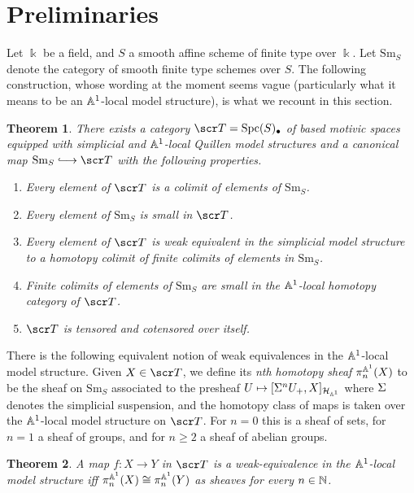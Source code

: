 \documentclass{amsart}
\newtheorem{thm}{Theorem}[section]
\theoremstyle{definition}
\begin{document}
\section{Preliminaries}\label{sec:prelims}
Let $\Bbbk$ be a field, and $S$ a smooth affine scheme of finite type over $\Bbbk$. Let $\mathrm{Sm}_{S}$ denote the category of smooth finite type schemes over $S$. The following construction, whose wording at the moment seems vague (particularly what it means to be an $\mathbb{A}^1$-local model structure), is what we recount in this section.
\begin{thm}
There exists a category $\sT = \mathrm{Spc}(S)_{\bu}$ of based motivic spaces equipped with simplicial and $\mathbb{A}^1$-local Quillen model structures and a canonical map $\mathrm{Sm}_S \monoto \sT$ with the following properties.
\begin{enumerate}
\item Every element of $\sT$ is a colimit of elements of $\mathrm{Sm}_{S}$.
\item Every element of $\mathrm{Sm}_S$ is small in $\sT$.
\item Every element of $\sT$ is weak equivalent in the simplicial model structure to a homotopy colimit of finite colimits of elements in $\mathrm{Sm}_S$.
\item Finite colimits of elements of $\mathrm{Sm}_S$ are small in the $\mathbb{A}^1$-local homotopy category of $\sT$.
\item $\sT$ is tensored and cotensored over itself.
\end{enumerate}
\end{thm}

There is the following equivalent notion of weak equivalences in the $\mathbb{A}^1$-local model structure. Given $X \in \sT$, we define its \emph{nth homotopy sheaf} $\pi_{n}^{\mathbb{A}^1}(X)$ to be the sheaf on $\mathrm{Sm}_S$ associated to the presheaf $U \mapsto [\Sigma^n U_{+}, X]_{{\mathcal{H}}_{\mathbb{A}^1}}$ where $\Sigma$ denotes the simplicial suspension, and the homotopy class of maps is taken over the $\mathbb{A}^1$-local model structure on $\sT$. For $n=0$ this is a sheaf of sets, for $n=1$ a sheaf of groups, and for $n \geq 2$ a sheaf of abelian groups.

\begin{thm} 
A map $f : X \to Y$ in $\sT$ is a weak-equivalence in the $\mathbb{A}^1$-local model structure iff $\pi_n^{\mathbb{A}^1}(X) \cong \pi_n^{\mathbb{A}^1}(Y)$ as sheaves for every $n \in \mathbb{N}$.
\end{thm}
\end{document}
